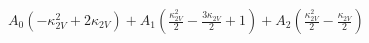 $
A_{0} \left(- \kappa_{2V}^{2} + 2 \kappa_{2V}\right) + A_{1} \left(\frac{\kappa_{2V}^{2}}{2} - \frac{3 \kappa_{2V}}{2} + 1\right) + A_{2} \left(\frac{\kappa_{2V}^{2}}{2} - \frac{\kappa_{2V}}{2}\right)
$

